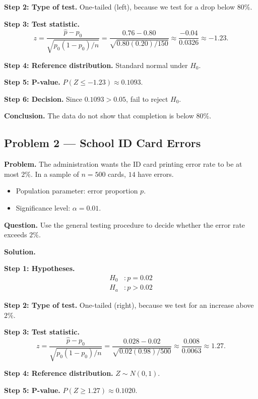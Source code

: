 	\textbf{Step 2: Type of test.} One-tailed (left), because we test for a drop below $80\%$.
	
	\textbf{Step 3: Test statistic.}
	\[
	z = \frac{\hat{p}-p_0}{\sqrt{p_0(1-p_0)/n}} = \frac{0.76-0.80}{\sqrt{0.80(0.20)/150}} \approx \frac{-0.04}{0.0326} \approx -1.23.
	\]
	
	\textbf{Step 4: Reference distribution.} Standard normal under $H_0$.
	
	\textbf{Step 5: P-value.} $P(Z\le -1.23)\approx 0.1093$.
	
	\textbf{Step 6: Decision.} Since $0.1093>0.05$, fail to reject $H_0$.
	
	\textbf{Conclusion.} The data do not show that completion is below $80\%$.
	
	\hypertarget{c4-ex2}{}
	\subsection*{Problem 2 — School ID Card Errors}
	
	\textbf{Problem.} The administration wants the ID card printing error rate to be at most $2\%$. In a sample of $n=500$ cards, $14$ have errors.
	\begin{itemize}
		\item Population parameter: error proportion $p$.
		\item Significance level: $\alpha=0.01$.
	\end{itemize}
	
	\textbf{Question.} Use the general testing procedure to decide whether the error rate exceeds $2\%$.
	
	\textbf{Solution.}
	
	\textbf{Step 1: Hypotheses.}
	\[
	\begin{aligned}
		H_0&: p = 0.02 \\
		H_a&: p > 0.02
	\end{aligned}
	\]
	
	\textbf{Step 2: Type of test.} One-tailed (right), because we test for an increase above $2\%$.
	
	\textbf{Step 3: Test statistic.}
	\[
	z = \frac{\hat{p}-p_0}{\sqrt{p_0(1-p_0)/n}} = \frac{0.028-0.02}{\sqrt{0.02(0.98)/500}} \approx \frac{0.008}{0.0063} \approx 1.27.
	\]
	
	\textbf{Step 4: Reference distribution.} $Z \sim N(0,1)$.
	
	\textbf{Step 5: P-value.} $P(Z\ge 1.27)\approx 0.1020$.
	

